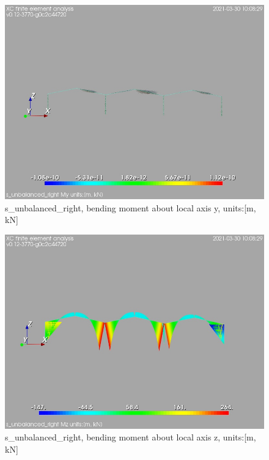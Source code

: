 \begin{figure}
\begin{center}
\includegraphics[width=\linewidth]{calc_results/sole_zeinali/text/graphics/resSimplLC/s_unbalanced_rightallMemberSetMy}
\caption{s_unbalanced_right, bending moment about local axis y, units:[m, kN]}
\end{center}
\end{figure}
\begin{figure}
\begin{center}
\includegraphics[width=\linewidth]{calc_results/sole_zeinali/text/graphics/resSimplLC/s_unbalanced_rightallMemberSetMz}
\caption{s_unbalanced_right, bending moment about local axis z, units:[m, kN]}
\end{center}
\end{figure}
